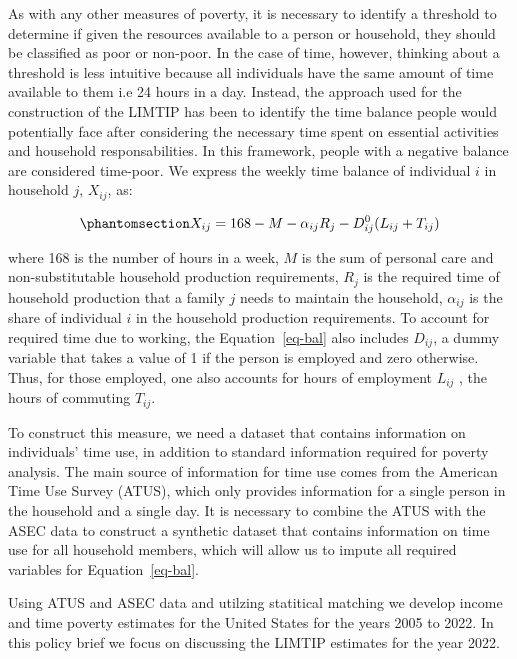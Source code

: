 \documentclass[
  11pt,
]{article}
\begin{document}
As with any other measures of poverty, it is necessary to identify a
threshold to determine if given the resources available to a person or
household, they should be classified as poor or non-poor. In the case of
time, however, thinking about a threshold is less intuitive because all
individuals have the same amount of time available to them i.e 24 hours
in a day. Instead, the approach used for the construction of the LIMTIP
has been to identify the time balance people would potentially face
after considering the necessary time spent on essential activities and
household responsabilities. In this framework, people with a negative
balance are considered time-poor. We express the weekly time balance of
individual \(i\) in household \(j\), \(X_{ij}\), as:

\begin{equation}\phantomsection\label{eq-bal}{X_{ij} = 168 - M - \alpha_{ij}R_j-D_{ij}^0(L_{ij}+T_{ij})
}\end{equation}

where 168 is the number of hours in a week, \(M\) is the sum of personal
care and non-substitutable household production requirements, \(R_j\) is
the required time of household production that a family \(j\) needs to
maintain the household, \(\alpha_{ij}\) is the share of individual \(i\)
in the household production requirements. To account for required time
due to working, the Equation~\ref{eq-bal} also includes \(D_{ij}\), a
dummy variable that takes a value of 1 if the person is employed and
zero otherwise. Thus, for those employed, one also accounts for hours of
employment \(L_{ij}\) , the hours of commuting \(T_{ij}\).

To construct this measure, we need a dataset that contains information
on individuals' time use, in addition to standard information required
for poverty analysis. The main source of information for time use comes
from the American Time Use Survey (ATUS), which only provides
information for a single person in the household and a single day. It is
necessary to combine the ATUS with the ASEC data to construct a
synthetic dataset that contains information on time use for all
household members, which will allow us to impute all required variables
for Equation~\ref{eq-bal}.

Using ATUS and ASEC data and utilzing statitical matching we develop
income and time poverty estimates for the United States for the years
2005 to 2022. In this policy brief we focus on discussing the LIMTIP
estimates for the year 2022.
\end{document}
